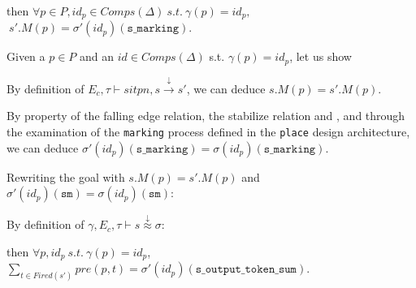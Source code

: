 \documentclass[dvipsnames,12pt]{article}
\begin{document}
\begin{lemma}
  \label{lem:fe-equal-marking}
  \fehyps{} then
  $\forall{}p\in{}P,id_p\in{}Comps(\Delta)~s.t.~\gamma(p)=id_p,$
  $~s'.M(p)=\sigma'(id_p)(\texttt{s\_marking})$.
\end{lemma}

\begin{niproof}
  Given a $p\in{}P$ and an $id\in{}Comps(\Delta)$
  s.t. $\gamma(p)=id_p$, let us show\\

  By definition of
  $E_c,\tau\vdash{}sitpn,s\xrightarrow{\downarrow}s'$, we can deduce
  $s.M(p)=s'.M(p)$.

  By property of the \hvhdl{} falling edge relation, the stabilize
  relation and \InCsCompP, and through the examination of the
  \texttt{marking} process defined in the \texttt{place} design
  architecture, we can deduce
  $\sigma'(id_p)(\texttt{s\_marking})=\sigma(id_p)(\texttt{s\_marking})$.

  Rewriting the goal with $s.M(p)=s'.M(p)$ and
  $\sigma'(id_p)(\texttt{sm})=\sigma(id_p)(\texttt{sm})$:\\

  \noindent{}By definition of
  $\gamma,E_c,\tau\vdash{}s\stackrel{\downarrow}{\approx}\sigma$:
  
\end{niproof}


\begin{lemma}
  \label{lem:fe-equal-ots}
  \fehyps{} then $\forall{}p,id_p~s.t.~\gamma(p)=id_p$,
  $\sum\limits_{t\in{}Fired(s')}pre(p,t)=\sigma'(id_p)(\texttt{s\_output\_token\_sum})$.
\end{lemma}
\end{document}
